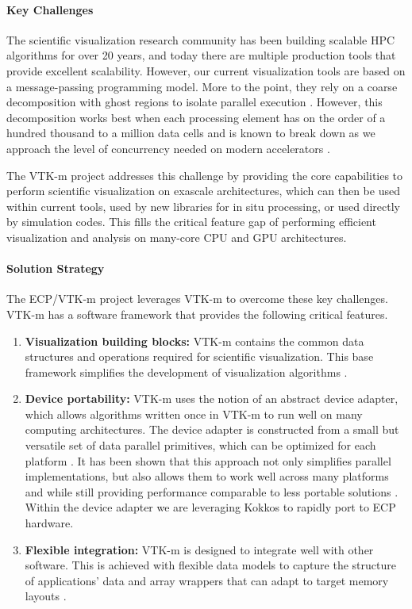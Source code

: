\paragraph{Key Challenges}
The scientific visualization research community has been building scalable HPC algorithms for over 20 years, and today there are multiple production tools that provide excellent scalability.
However, our current visualization tools are based on a message-passing programming model.
More to the point, they rely on a coarse decomposition with ghost regions to isolate parallel execution \cite{Ahrens2001,Childs2010}.
However, this decomposition works best when each processing element has on the order of a hundred thousand to a million data cells \cite{ParaViewTutorial} and is known to break down as we approach the level of concurrency needed on modern accelerators \cite{Moreland2012:Ultravis,Moreland2013:UltraVis}.

The VTK-m project addresses this challenge by providing the core capabilities to perform scientific visualization on exascale architectures, which can then be used within current tools, used by new libraries for in situ processing, or used directly by simulation codes.
This fills the critical feature gap of performing efficient visualization and analysis on many-core CPU and GPU architectures.


\paragraph{Solution Strategy}
The ECP/VTK-m project leverages VTK-m \cite{Moreland2016:VTKm} to overcome these key challenges.
VTK-m has a software framework that provides the following critical features.

\begin{enumerate}
\item \textbf{Visualization building blocks:}
  VTK-m contains the common data structures and operations required for scientific visualization.
  This base framework simplifies the development of visualization algorithms \cite{VTKmUsersGuide}.
\item \textbf{Device portability:}
  VTK-m uses the notion of an abstract device adapter, which allows algorithms written once in VTK-m to run well on many computing architectures.
  The device adapter is constructed from a small but versatile set of data parallel primitives, which can be optimized for each platform \cite{Blelloch1990}.
  It has been shown that this approach not only simplifies parallel implementations, but also allows them to work well across many platforms \cite{Lo2012,Larsen2015,Moreland2015} and while still providing performance comparable to less portable solutions \cite{Moreland2021}.
  Within the device adapter we are leveraging Kokkos \cite{Edwards2011} to rapidly port to ECP hardware.
\item \textbf{Flexible integration:}
  VTK-m is designed to integrate well with other software.
  This is achieved with flexible data models to capture the structure of applications' data \cite{Meredith2012} and array wrappers that can adapt to target memory layouts \cite{Moreland2012:PDAC}.
\end{enumerate}


